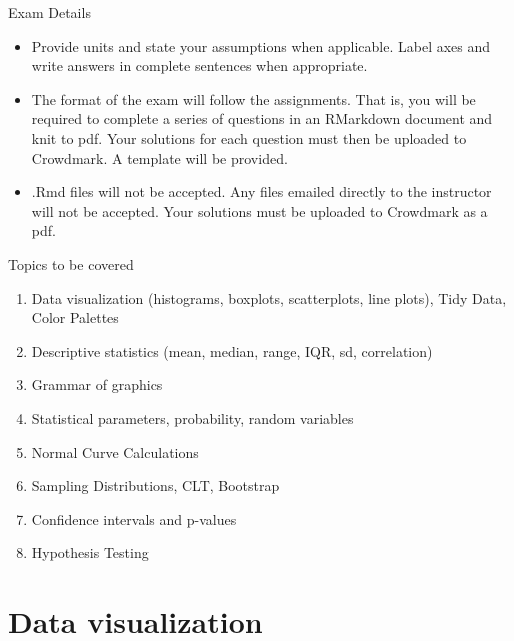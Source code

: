 \documentclass[10pt]{beamer}\usepackage[]{graphicx}\usepackage[]{color}
\begin{document}
\begin{frame}{Exam Details}
	
	\begin{itemize}
		\setlength\itemsep{.51em}
		
		\item Provide units and state your assumptions when applicable. Label axes and write answers in complete sentences when appropriate.

\item The format of the exam will follow the assignments. That is, you will be required to complete a series of questions in an RMarkdown document and knit to pdf. Your solutions for each question must then be uploaded to Crowdmark. A template will be provided. 

\item .Rmd files will not be accepted. Any files emailed directly to the instructor will not be accepted. Your solutions must be uploaded to Crowdmark as a pdf. 
		
	\end{itemize}
	
\end{frame}


\begin{frame}{Topics to be covered}
	
	\begin{enumerate}
		\setlength\itemsep{.51em}
		\item Data visualization (histograms, boxplots, scatterplots, line plots), Tidy Data, Color Palettes
		\item Descriptive statistics (mean, median, range, IQR, sd, correlation)
		\item Grammar of graphics
		\item Statistical parameters, probability, random variables
		\item Normal Curve Calculations
		\item Sampling Distributions, CLT, Bootstrap
		\item Confidence intervals and p-values
		\item Hypothesis Testing
	\end{enumerate}
	
\end{frame}

\section{Data visualization}
\end{document}
